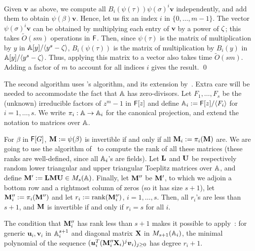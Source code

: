  Given $\boldsymbol{v}$ as above, we compute all $B_i(\psi(\tau))
 \psi(\sigma)^i \boldsymbol{v}$ independently, and add them to obtain
 $\psi(\beta) \boldsymbol{v}$. Hence, let us fix an index $i$ in
 $\{0,\dots,m-1\}$.
 The vector $\psi(\sigma)^i \boldsymbol{v}$ can be obtained by
 multiplying each entry of $\boldsymbol{v}$ by a power of $\zeta$;
 this takes $\tilde{O}(sm)$ operations in ${\mathsf{F}}$. Then, since
 $\psi(\tau)$ is the matrix of multiplication by $y$ in $\mathbb{A}[y]/\langle
 y^s-\zeta\rangle$, $B_i(\psi(\tau))$ is the matrix of multiplication
 by $B_i(y)$ in $\mathbb{A}[y]/\langle y^s-\zeta\rangle$. Thus, applying this
 matrix to a vector also takes time $\tilde{O}(sm)$.
 Adding a factor of $m$ to account for all indices $i$ gives
 the result.
\qed





  The second algorithm uses \citeauthor{Wiedemann86}'s
  \citeyear{Wiedemann86} algorithm,
  and its extension by~. Extra care will be needed to
  accommodate the fact that $\mathbb{A}$ has zero-divisors. Let
  $F_1,\dots,F_s$ be the (unknown) irreducible factors of $z^m-1$ in
  ${\mathsf{F}}[z]$ and define $\mathbb{A}_i := {\mathsf{F}}[z]/\langle F_i \rangle$ for
  $i=1,\dots,s$. We write $\pi_i: \mathbb{A} \to\mathbb{A}_i$ for the canonical
  projection, and extend the notation to matrices over $\mathbb{A}$.

  For $\beta$ in ${\mathsf{F}}[G]$, $\mat M:=\psi(\beta)$ is invertible if and only
  if all $\mat M_i := \pi_i(\mat M)$ are. We are going to use the algorithm
  of~\cite[Section~4]{KaSa91} to compute the rank of all these matrices
  (these ranks are well-defined, since all $\mathbb{A}_i$'s are fields).  Let
  $\mat L$ and $\mat U$ be respectively random lower triangular and upper
  triangular Toeplitz matrices over $\mathbb{A}$, and define
  $\mat M':=\mat L \mat M \mat U \in M_s(\A)$. Finally, let $\mat M''$ be
  $\mat M'$, to which we adjoin a bottom row and a rightmost column of
  zeros (so it has size $s+1$), let $\mat M''_i :=\pi_i(\mat M'')$ and let
  $r_i :=\text{rank}(\mat M''_i)$, $i=1,\dots,s$. Then, all $r_i$'s are
  less than $s+1$, and $\mat M$ is invertible if and only if $r_i=s$ for
  all $i$.

  The condition that $\mat M''_i$ has rank less than $s+1$ makes it
  possible to apply~\cite[Lemma~2]{KaSa91}: for generic
  $\boldsymbol{u}_i, \boldsymbol{v}_i$ in $\mathbb{A}_i^{s+1}$ and diagonal
  matrix $\mat X$ in $M_{s+1}(\mathbb{A}_i)$, the minimal polynomial of the
  sequence $(\boldsymbol{u}_i^T (\mat M''_i \mat X_i)^j
  \boldsymbol{v}_i)_{j \ge 0}$ has degree $r_i+1$.


